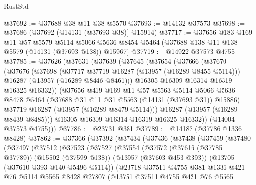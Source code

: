 \begin{lexlean}{RustStd}
\begin{coremodule}
@37692 := @37688 @38 @11 @38 @5570
@37693 := @14132 @37573
@37698 := @37686 (@37692 (@14131 (@37693 @38)) @15914)
@37717 := @37656
    @183
    @169
    @11
    @57
    @5579
    @5114
    @5066
    @5636
    @8454
    @5464
    (@37688 @138 @11 @138 @5579 (@14131 (@37693 @138)) @15967)
@37719 := @14922 @37573 @4755
@37785 := @37626
    (@37631
      (@37639
        (@37645
          (@37654
            (@37666
              (@37670
                (@37676
                  (@37698
                    (@37717 @37719 @16287 (@13957 (@16289 @8455 @5114)))
                    @16287
                    (@13957 (@16289 @8446 @8461)))
                  @16305
                  @16309
                  @16314
                  @16319
                  @16325
                  @16332))
              (@37656
                @419
                @169
                @11
                @57
                @5563
                @5114
                @5066
                @5636
                @8478
                @5464
                (@37688 @31 @11 @31 @5563 (@14131 (@37693 @31)) @15886)
                @37719
                @16287
                (@13957 (@16289 @8479 @5114)))
              @16287
              (@13957 (@16289 @8439 @8485)))
            @16305
            @16309
            @16314
            @16319
            @16325
            @16332))
        (@14004 @37573 @4755)))
@37786 := @23731 @381
@37789 := @14183 (@37786 @1336 @8428)
@37862 := @37366
    (@37392
      (@37434
        (@37436
          (@37438
            (@37459
              (@37480
                (@37497
                  (@37512
                    (@37523
                      (@37527
                        (@37554
                          (@37572
                            (@37616 (@37785 @37789))
                            (@15502 (@37599 @138))
                            (@13957 (@37603 @453 @393))
                            (@13705 (@37610 @393 @140 @5496 @5114))
                            (@23718
                              @37511
                              @4755
                              @381
                              @1336
                              @421
                              @76
                              @5114
                              @5565
                              @8428
                              @27807
                              (@13751
                                @37511
                                @4755
                                @421
                                @76
                                @5565

\end{coremodule}
\end{lexlean}
